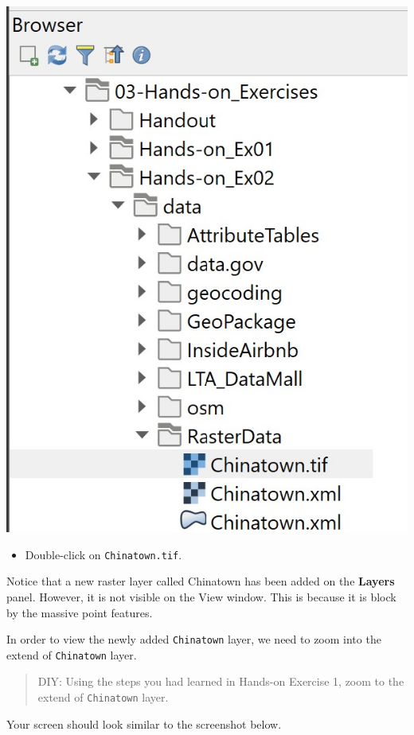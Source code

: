 \documentclass[
  letterpaper,
  DIV=11,
  numbers=noendperiod]{scrreprt}
\providecommand{\tightlist}{%
  \setlength{\itemsep}{0pt}\setlength{\parskip}{0pt}}\usepackage{longtable,booktabs,array}
\begin{document}
\includegraphics{./img02/image27.jpg}

\begin{itemize}
\tightlist
\item
  Double-click on \texttt{Chinatown.tif}.
\end{itemize}

Notice that a new raster layer called Chinatown has been added on the
\textbf{Layers} panel. However, it is not visible on the View window.
This is because it is block by the massive point features.

In order to view the newly added \texttt{Chinatown} layer, we need to
zoom into the extend of \texttt{Chinatown} layer.

\begin{quote}
DIY: Using the steps you had learned in Hands-on Exercise 1, zoom to the
extend of \texttt{Chinatown} layer.
\end{quote}

Your screen should look similar to the screenshot below.
\end{document}
